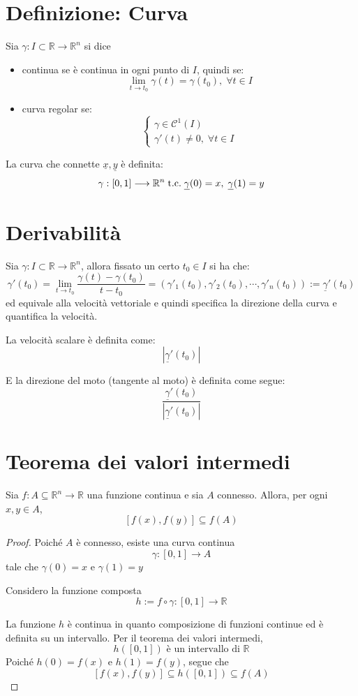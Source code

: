\documentclass[a4paper,12pt,openright]{book}
\begin{document}
    \section{Definizione: Curva}
    Sia $\gamma: I \subset \mathbb{R}\longrightarrow \mathbb{R}^n$ si dice 
    \begin{itemize}
    	\item continua se è continua in ogni punto di \(I\), quindi se:
    	\[\lim_{t \to t_0} \gamma(t) = \gamma(t_0), \; \forall t \in I\]
    	\item curva regolar se:
    	\[\begin{cases}
    		\gamma \in \mathcal{C}^1(I) \\
    		\gamma'(t) \not = 0, \; \forall t \in I
    	\end{cases}\]
    \end{itemize}
    
    La curva che connette $\underline{x}, \underline{y}$ è definita:
    \[\gamma: [0, 1] \longrightarrow \mathbb{R}^n \;\text{t.c.}\; \underline{\gamma}(0) = x, \; \underline{\gamma}(1) = y\]
    
    \section{Derivabilità}
    Sia $\gamma: I \subset \mathbb{R}\longrightarrow \mathbb{R}^n$, allora fissato un certo $t_0 \in I$ si ha che:
    \[\gamma'(t_0) = \lim_{t \to t_0} \frac{\gamma(t) - \gamma(t_0)}{t - t_0} = (\gamma'_1(t_0), \gamma'_2(t_0), \cdots, \gamma'_n(t_0)) := \underline{\gamma}'(t_0)\]
    ed equivale alla velocità vettoriale e quindi specifica la direzione della curva e quantifica la velocità.
    
    La velocità scalare è definita come:
    \[|\underline{\gamma}'(t_0)|\]
    
    E la direzione del moto (tangente al moto) è definita come segue:
    \[\frac{\underline{\gamma}'(t_0)}{|\underline{\gamma}'(t_0)|}\]
    
    \section{Teorema dei valori intermedi}
	Sia $f : A \subseteq \mathbb{R}^n \to \mathbb{R}$ una funzione continua e sia $A$ connesso.	Allora, per ogni $x,y \in A$,
	\[[f(x),f(y)] \subseteq f(A)\]
	
	\begin{proof}
		Poiché $A$ è connesso, esiste una curva continua
		\[\gamma : [0,1] \to A\]
		tale che $\gamma(0)=x$ e $\gamma(1)=y$	
			
		Considero la funzione composta
		\[h := f \circ \gamma : [0,1] \to \mathbb{R}\]
		
		La funzione $h$ è continua in quanto composizione di funzioni continue
		ed è definita su un intervallo.
		Per il teorema dei valori intermedi,
		\[h([0,1]) \text{ è un intervallo di } \mathbb{R}\]
		Poiché $h(0)=f(x)$ e $h(1)=f(y)$, segue che
		\[[f(x),f(y)] \subseteq h([0,1]) \subseteq f(A)\]
	\end{proof}
	
\end{document}
